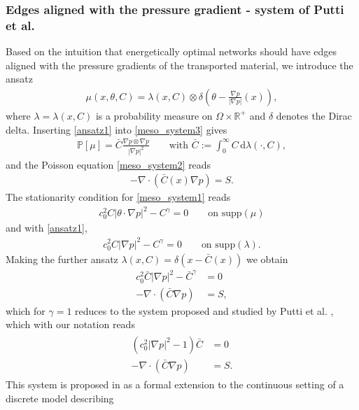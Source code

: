 \documentclass{article}
\numberwithin{equation}{section}
\newcommand{\R}{\mathbb{R}}
\def\[{\begin{eqnarray*}}
\def\]{\end{eqnarray*}}
\def\d{\,\mathrm{d}}
\begin{document}
\subsubsection{Edges aligned with the pressure gradient - system of Putti et al.}\label{sssec:Putti}
Based on the intuition that energetically optimal networks should have edges aligned with the pressure gradients of the transported material,
we introduce the ansatz
\begin{align}  \label{ansatz1}
   \mu(x,\theta,C) = \lambda(x,C) \otimes \delta\left(\theta - {\frac{\nabla p}{|\nabla p|}(x)}\right),
\end{align}
where $\lambda=\lambda(x,C)$ is a probability measure on $\Omega\times\R^+$ and
$\delta$ denotes the Dirac delta.
Inserting \eqref{ansatz1} into \eqref{meso_system3} gives
\[
   \mathbb{P}[\mu] = \bar{C} \frac{\nabla p \otimes \nabla p}{|\nabla p|^2}   \qquad\mbox{with } \bar{C}:= \int_0^\infty C \d\lambda(\cdot,C),
\]
and the Poisson equation \eqref{meso_system2} reads
\[
   - \nabla \cdot (\bar{C}(x) \nabla p) = S.
\]
The stationarity condition for \eqref{meso_system1} reads
\[
   c_0^2 C|\theta\cdot\nabla p|^2 - C^\gamma = 0 \qquad\mbox{on supp}(\mu)
\]
and with \eqref{ansatz1},
\[
   c_0^2 C|\nabla p|^2 - C^\gamma = 0 \qquad\mbox{on supp}(\lambda).
\]
Making the further ansatz $\lambda(x,C) = \delta(x-\bar C(x))$ we obtain
\begin{align*}
    c_0^2 \bar{C}|\nabla p|^2 - \bar{C}^\gamma &= 0 \\
    -\nabla \cdot (\bar{C} \nabla p)&=S,
\end{align*}
which for $\gamma=1$ reduces to the system proposed and studied by Putti et al. \cite{facca2018towards}, %
which with our notation reads
\begin{align}\label{Putti}
\begin{aligned}
    (c_0^2 |\nabla p|^2 - 1) \bar{C} &= 0 \\
    -\nabla \cdot (\bar{C} \nabla p)&=S.
\end{aligned}
\end{align}
This system is proposed in \cite{facca2018towards} as a formal extension to the continuous setting of a discrete model \cite{Tero} describing
\end{document}
